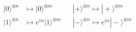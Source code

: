 \documentclass[preview]{standalone}
\begin{document}
\begin{align*}
|0\rangle ^{\otimes n} &\mapsto |0\rangle ^{\otimes m} &&|+\rangle ^{\otimes n} \mapsto |+\rangle ^{\otimes m} \\
|1\rangle ^{\otimes n} &\mapsto e^{i\alpha}|1\rangle ^{\otimes m} &&|-\rangle ^{\otimes n} \mapsto e^{i\alpha}|-\rangle ^{\otimes m}
\end{align*}
\end{document}
